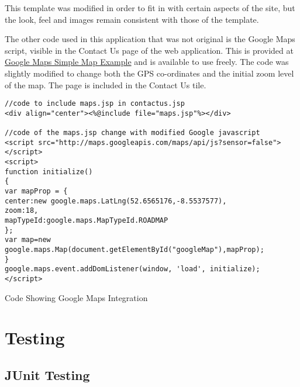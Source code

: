This template was modified in order to fit in with certain aspects of the site, but the look, feel and images remain consistent with those of the template.

The other code used in this application that was not original is the Google Maps script, visible in the Contact Us page of the web application. This is provided at \href{https://developers.google.com/maps/documentation/javascript/examples/map-simple}{Google Maps Simple Map Example} and is available to use freely. The code was slightly modified to change both the GPS co-ordinates and the initial zoom level of the map. The page is included in the Contact Us tile.\newline

\begin{table}[H]
\begin{lstlisting}
//code to include maps.jsp in contactus.jsp
<div align="center"><%@include file="maps.jsp"%></div>

//code of the maps.jsp change with modified Google javascript
<script src="http://maps.googleapis.com/maps/api/js?sensor=false">
</script>
<script>
function initialize()
{
var mapProp = {
center:new google.maps.LatLng(52.6565176,-8.5537577),
zoom:18,
mapTypeId:google.maps.MapTypeId.ROADMAP
};
var map=new google.maps.Map(document.getElementById("googleMap"),mapProp);
}
google.maps.event.addDomListener(window, 'load', initialize);
</script>

\end{lstlisting}
\caption{Code Showing Google Maps Integration}
\end{table}
\pagebreak

\section{Testing}

\subsection{JUnit Testing}




